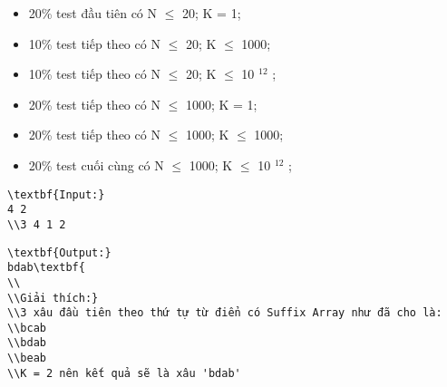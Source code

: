 \begin{itemize}
	\item     20\% test đầu tiên có N  $\le$  20; K = 1;   
	\item     10\% test tiếp theo có N  $\le$  20; K  $\le$  1000;   
	\item     10\% test tiếp theo có N  $\le$  20; K  $\le$  10    $^     12    $    ;   
	\item     20\% test tiếp theo có N  $\le$  1000; K = 1;   
	\item     20\% test tiếp theo có N  $\le$  1000; K  $\le$ 1000;   
	\item     20\% test cuối cùng có N  $\le$  1000; K  $\le$  10    $^     12    $    ;   
\end{itemize}
\begin{verbatim}
\textbf{Input:}
4 2
\\3 4 1 2\end{verbatim}
\begin{verbatim}
\textbf{Output:}
bdab\textbf{
\\
\\Giải thích:}
\\3 xâu đầu tiên theo thứ tự từ điển có Suffix Array như đã cho là:
\\bcab
\\bdab
\\beab
\\K = 2 nên kết quả sẽ là xâu 'bdab' \end{verbatim}